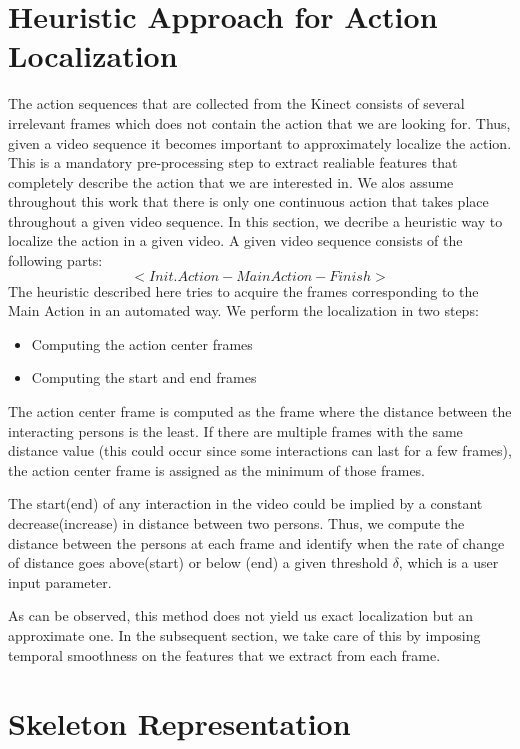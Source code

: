 \documentclass[10pt,twocolumn,letterpaper]{article}
\begin{document}
\section{Heuristic Approach for Action Localization}\label{sec:actionlocalization}

The action sequences that are collected from the Kinect consists of several irrelevant frames which does not contain the action that we are looking for. Thus, given a video sequence it becomes important to approximately localize the action. This is a mandatory pre-processing step to extract realiable features that completely describe the action that  we are interested in. We alos assume throughout this work that there is only one continuous action that takes place throughout a given video sequence. In this section, we decribe a heuristic way to localize the action in a given video. A given video sequence consists of the following parts:
\begin{equation}
<Init. Action - Main Action - Finish>
\end{equation}
The heuristic described here tries to acquire the frames corresponding to the Main Action  in an automated way. We perform the localization in two steps:
\begin{itemize}
\item Computing the action center frames
\item Computing the start and end frames
\end{itemize}

The action center frame is computed as the frame where the distance between the interacting persons is the least. If there are multiple frames with the same distance value (this could occur since some interactions can last for a few frames), the action center frame is assigned as the minimum of those frames.

The start(end) of any interaction in the video could be implied by a constant decrease(increase) in distance between two persons. Thus, we compute the distance between the persons at each frame and identify when the rate of change of distance goes above(start) or below (end) a given threshold $\delta$, which is a user input parameter. 


As can be observed, this method does not yield us exact localization but an approximate one. In the subsequent section, we take care of this by imposing temporal smoothness on the features that we extract from each frame. 


\section{Skeleton Representation}\label{sec:Feat}
\end{document}
